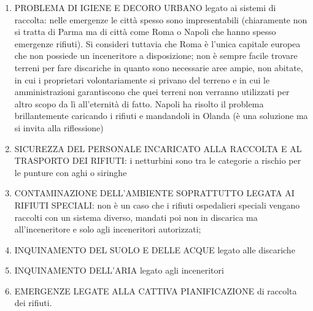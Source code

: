 \begin{enumerate}

\item
   
  PROBLEMA DI IGIENE E DECORO URBANO legato ai sistemi di raccolta:
  nelle emergenze le città spesso sono impresentabili (chiaramente non
  si tratta di Parma ma di città come Roma o Napoli che hanno spesso
  emergenze rifiuti). Si consideri tuttavia che Roma è l'unica capitale
  europea che non possiede un inceneritore a disposizione; non è sempre
  facile trovare terreni per fare discariche in quanto sono necessarie
  aree ampie, non abitate, in cui i proprietari volontariamente si
  privano del terreno e in cui le amministrazioni garantiscono che quei
  terreni non verranno utilizzati per altro scopo da lì all'eternità di
  fatto. Napoli ha risolto il problema brillantemente caricando i
  rifiuti e mandandoli in Olanda (è una soluzione ma si invita alla
  riflessione)
   
\item
   
  SICUREZZA DEL PERSONALE INCARICATO ALLA RACCOLTA E AL TRASPORTO DEI
  RIFIUTI: i netturbini sono tra le categorie a rischio per le punture
  con aghi o siringhe
   
\item
   
  CONTAMINAZIONE DELL'AMBIENTE SOPRATTUTTO LEGATA AI RIFIUTI SPECIALI:
  non è un caso che i rifiuti ospedalieri speciali vengano raccolti con
  un sistema diverso, mandati poi non in discarica ma all'inceneritore e
  solo agli inceneritori autorizzati;
   
\item
   
  INQUINAMENTO DEL SUOLO E DELLE ACQUE legato alle discariche
   
\item
   
  INQUINAMENTO DELL'ARIA legato agli inceneritori
   
\item
   
  EMERGENZE LEGATE ALLA CATTIVA PIANIFICAZIONE di raccolta dei rifiuti.
   
\end{enumerate}

